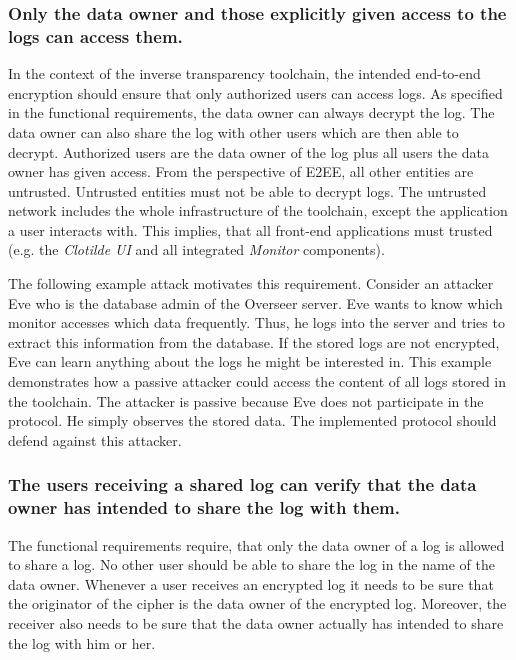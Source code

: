 \documentclass[../main.tex]{subfiles}
\begin{document}
\subsubsection{Only the data owner and those explicitly given access to the logs can access them.}
In the context of the inverse transparency toolchain, the intended end-to-end encryption should ensure that only authorized users can access logs.
As specified in the functional requirements, the data owner can always decrypt the log.
The data owner can also share the log with other users which are then able to decrypt.
Authorized users are the data owner of the log plus all users the data owner has given access.
From the perspective of E2EE, all other entities are untrusted.
Untrusted entities must not be able to decrypt logs.
The untrusted network includes the whole infrastructure of the toolchain, except the application a user interacts with.
This implies, that all front-end applications must trusted (e.g. the \emph{Clotilde UI} and all integrated \emph{Monitor} components).

The following example attack motivates this requirement.
Consider an attacker Eve who is the database admin of the Overseer server.
Eve wants to know which monitor accesses which data frequently.
Thus, he logs into the server and tries to extract this information from the database.
If the stored logs are not encrypted, Eve can learn anything about the logs he might be interested in.
This example demonstrates how a passive attacker could access the content of all logs stored in the toolchain.
The attacker is passive because Eve does not participate in the protocol.
He simply observes the stored data.
The implemented protocol should defend against this attacker.

\subsubsection{The users receiving a shared log can verify that the data owner has intended to share the log with them.}

The functional requirements require, that only the data owner of a log is allowed to share a log.
No other user should be able to share the log in the name of the data owner.
Whenever a user receives an encrypted log it needs to be sure that the originator of the cipher is the data owner of the encrypted log.
Moreover, the receiver also needs to be sure that the data owner actually has intended to share the log with him or her.
\end{document}
